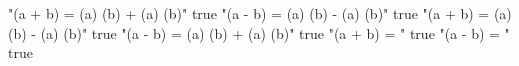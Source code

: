 "\sin(a + b) = \sin(a) \cos(b) + \cos(a) \sin(b)" true
"\sin(a - b) = \sin(a) \cos(b) - \cos(a) \sin(b)" true
"\cos(a + b) = \cos(a) \cos(b) - \sin(a) \sin(b)" true
"\cos(a - b) = \cos(a) \cos(b) + \sin(a) \sin(b)" true
"\tan(a + b) = " true
"\tan(a - b) = " true
